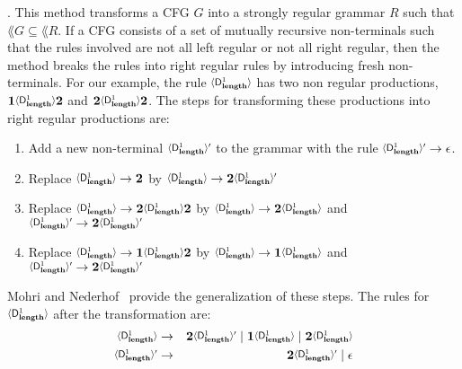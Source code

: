 .   This   method
transforms a CFG $G$ into a strongly  regular grammar $R$ such that $\lang{G} \subseteq \lang{R}$. 
If a CFG consists of a set of mutually recursive non-terminals such that the rules involved are not all left regular or not all right regular, then the method breaks the rules into right regular rules by introducing fresh non-terminals. For our example, the rule  $\var{\Df{\length}{1}}$ has two non regular productions,           $\acdr\var{\Df{\length}{1}}\clazy$          and
$\clazy\var{\Df{\length}{1}}{\clazy}$.  The steps for transforming these productions into
right regular productions are:

\begin{enumerate}
\item
Add a  new non-terminal  $\varnew{\Df{\length}{1}}$ to the  grammar with
the rule $\varnew{\Df{\length}{1}} \rightarrow \epsilon$.
\item
 Replace     $\var{\Df{\length}{1}}     \rightarrow     \clazy$     by
 $\var{\Df{\length}{1}} \rightarrow \clazy\varnew{\Df{\length}{1}}$
\item
 Replace
 $\var{\Df{\length}{1}} \rightarrow \clazy\var{\Df{\length}{1}}\clazy$
 by  $\var{\Df{\length}{1}}  \rightarrow  \clazy\var{\Df{\length}{1}}$
 and \linebreak $\varnew{\Df{\length}{1}} \rightarrow \clazy\varnew{\Df{\length}{1}}$
\item
  Replace
 $\var{\Df{\length}{1}} \rightarrow \acdr\var{\Df{\length}{1}}\clazy$
 by $\var{\Df{\length}{1}} \rightarrow \acdr\var{\Df{\length}{1}}$ and
 \linebreak $\varnew{\Df{\length}{1}} \rightarrow \clazy\varnew{\Df{\length}{1}}$
\end{enumerate}

Mohri and Nederhof~\cite{mohri00regular} provide the generalization of
these  steps.  The  rules for  
$\var{\Df{\length}{1}}$ after the transformation are:
\begin{eqnarray*}              
  \var{\Df{\length}{1}}   &\rightarrow&   \clazy\varnew{\Df{\length}{1}}
  \mid                 \acdr\var{\Df{\length}{1}}                 \mid
  \clazy\var{\Df{\length}{1}}\\  \varnew{\Df{\length}{1}}  &\rightarrow&
  \clazy\varnew{\Df{\length}{1}} \mid \epsilon
\end{eqnarray*}



